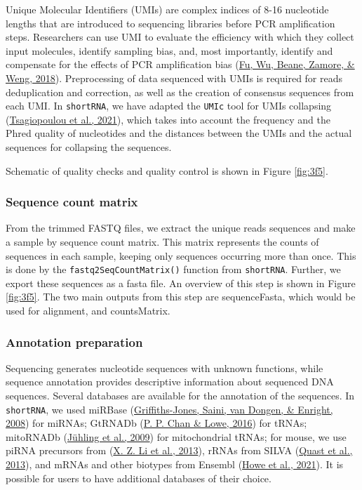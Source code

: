 \documentclass[12pt,twoside]{reedthesis}
\begin{document}
Unique Molecular Identifiers (UMIs) are complex indices of 8-16
nucleotide lengths that are introduced to sequencing libraries before
PCR amplification steps. Researchers can use UMI to evaluate the
efficiency with which they collect input molecules, identify sampling
bias, and, most importantly, identify and compensate for the effects of
PCR amplification bias (\protect\hyperlink{ref-fu2018}{Fu, Wu, Beane, Zamore, \& Weng, 2018}). Preprocessing of data sequenced with
UMIs is required for reads deduplication and correction, as well as the
creation of consensus sequences from each UMI. In \texttt{shortRNA}, we have
adapted the \texttt{UMIc} tool for UMIs collapsing (\protect\hyperlink{ref-tsagiopoulou2021}{Tsagiopoulou et al., 2021}), which
takes into account the frequency and the Phred quality of nucleotides
and the distances between the UMIs and the actual sequences for
collapsing the sequences.

Schematic of quality checks and quality control is shown in Figure \ref{fig:3f5}.



\hypertarget{sequence-count-matrix}{%
\subsubsection{Sequence count matrix}\label{sequence-count-matrix}}

From the trimmed FASTQ files, we extract the unique reads sequences and
make a sample by sequence count matrix. This matrix represents the
counts of sequences in each sample, keeping only sequences occurring
more than once. This is done by the \texttt{fastq2SeqCountMatrix()} function from
\texttt{shortRNA}. Further, we export these sequences as a fasta file. An
overview of this step is shown in Figure \ref{fig:3f5}. The two main outputs from
this step are sequenceFasta, which would be used for alignment, and
countsMatrix.

\hypertarget{annotation-preparation}{%
\subsubsection{Annotation preparation}\label{annotation-preparation}}

Sequencing generates nucleotide sequences with unknown functions, while
sequence annotation provides descriptive information about sequenced DNA
sequences. Several databases are available for the annotation of the
sequences. In \texttt{shortRNA}, we used miRBase (\protect\hyperlink{ref-griffiths-jones2008}{Griffiths-Jones, Saini, van Dongen, \& Enright, 2008}) for
miRNAs; GtRNADb (\protect\hyperlink{ref-chan2016}{P. P. Chan \& Lowe, 2016}) for tRNAs; mitoRNADb (\protect\hyperlink{ref-juxfchling2009}{Jühling et al., 2009}) for
mitochondrial tRNAs; for mouse, we use piRNA precursors from (\protect\hyperlink{ref-li2013}{X. Z. Li et al., 2013}),
rRNAs from SILVA (\protect\hyperlink{ref-quast2013}{Quast et al., 2013}), and mRNAs and other biotypes from Ensembl
(\protect\hyperlink{ref-howe2021}{Howe et al., 2021}). It is possible for users to have additional databases of
their choice.
\end{document}
